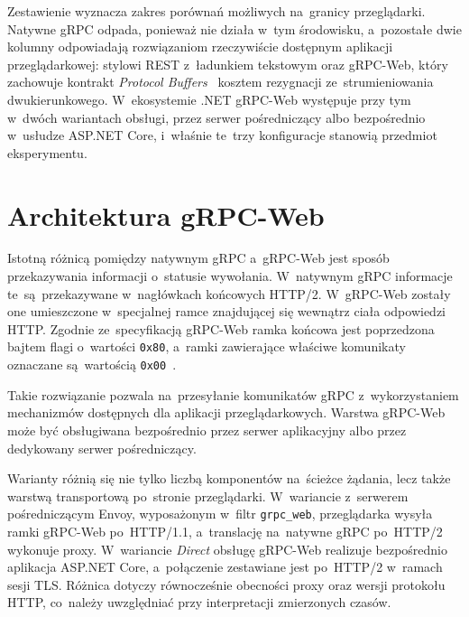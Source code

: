 Zestawienie wyznacza zakres porównań możliwych na~granicy przeglądarki. Natywne gRPC odpada, ponieważ nie działa w~tym środowisku, a~pozostałe dwie kolumny odpowiadają rozwiązaniom rzeczywiście dostępnym aplikacji przeglądarkowej: stylowi REST z~ładunkiem tekstowym oraz gRPC-Web, który zachowuje kontrakt \textit{Protocol Buffers}~\cite{bib:ProtocolBuffers} kosztem rezygnacji ze~strumieniowania dwukierunkowego. W~ekosystemie .NET gRPC-Web występuje przy tym w~dwóch wariantach obsługi, przez serwer pośredniczący albo bezpośrednio w~usłudze ASP.NET Core, i~właśnie te~trzy konfiguracje stanowią przedmiot eksperymentu.


\section{Architektura gRPC-Web}

\label{sec:ArchitekturagRPCWeb}

Istotną różnicą pomiędzy natywnym gRPC a~gRPC-Web jest sposób przekazywania informacji o~statusie wywołania. W~natywnym gRPC informacje te~są~przekazywane w~nagłówkach końcowych HTTP/2. W~gRPC-Web zostały one umieszczone w~specjalnej ramce znajdującej się wewnątrz ciała odpowiedzi HTTP. Zgodnie ze~specyfikacją gRPC-Web ramka końcowa jest poprzedzona bajtem flagi o~wartości \texttt{0x80}, a~ramki zawierające właściwe komunikaty oznaczane są~wartością \texttt{0x00}~\cite{bib:ProtocolWeb}.

Takie rozwiązanie pozwala na~przesyłanie komunikatów gRPC z~wykorzystaniem mechanizmów dostępnych dla aplikacji przeglądarkowych. Warstwa gRPC-Web może być obsługiwana bezpośrednio przez serwer aplikacyjny albo przez dedykowany serwer pośredniczący.

Warianty różnią się nie tylko liczbą komponentów na~ścieżce żądania, lecz także warstwą transportową po~stronie przeglądarki. W~wariancie z~serwerem pośredniczącym Envoy, wyposażonym w~filtr \texttt{grpc\_web}, przeglądarka wysyła ramki gRPC-Web po~HTTP/1.1, a~translację na~natywne gRPC po~HTTP/2 wykonuje proxy. W~wariancie \textit{Direct} obsługę gRPC-Web realizuje bezpośrednio aplikacja ASP.NET Core, a~połączenie zestawiane jest po~HTTP/2 w~ramach sesji TLS. Różnica dotyczy równocześnie obecności proxy oraz wersji protokołu HTTP, co~należy uwzględniać przy interpretacji zmierzonych czasów.


